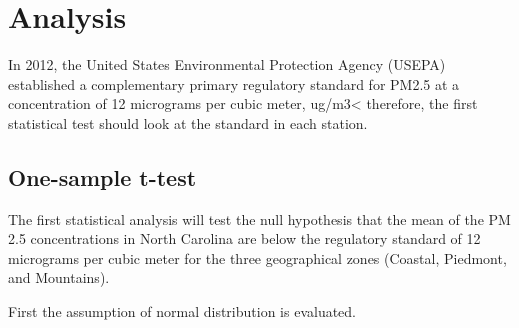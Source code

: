 \documentclass[12pt,]{article}
\newenvironment{Shaded}{\begin{snugshade}}{\end{snugshade}}
\newcommand{\KeywordTok}[1]{\textcolor[rgb]{0.13,0.29,0.53}{\textbf{#1}}}
\newcommand{\DecValTok}[1]{\textcolor[rgb]{0.00,0.00,0.81}{#1}}
\newcommand{\StringTok}[1]{\textcolor[rgb]{0.31,0.60,0.02}{#1}}
\newcommand{\OperatorTok}[1]{\textcolor[rgb]{0.81,0.36,0.00}{\textbf{#1}}}
\newcommand{\NormalTok}[1]{#1}
\begin{document}
\newpage

\section{Analysis}\label{analysis}

In 2012, the United States Environmental Protection Agency (USEPA)
established a complementary primary regulatory standard for PM2.5 at a
concentration of 12 micrograms per cubic meter, ug/m3\textless{}
therefore, the first statistical test should look at the standard in
each station.

\subsection{One-sample t-test}\label{one-sample-t-test}

The first statistical analysis will test the null hypothesis that the
mean of the PM 2.5 concentrations in North Carolina are below the
regulatory standard of 12 micrograms per cubic meter for the three
geographical zones (Coastal, Piedmont, and Mountains).

First the assumption of normal distribution is evaluated.

\begin{Shaded}
\end{Shaded}
\end{document}
